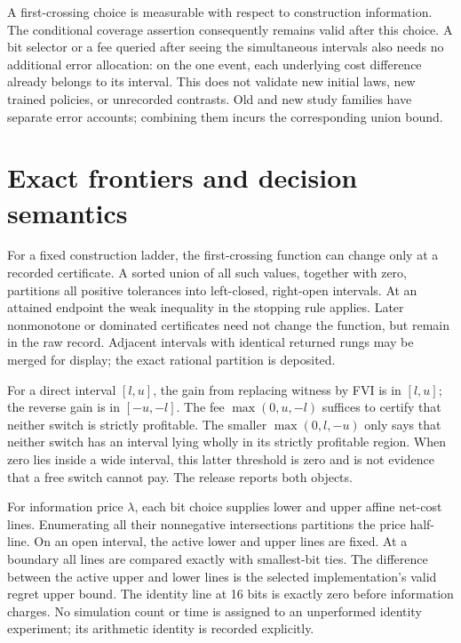 \documentclass[ecta,nameyear,draft]{econsocart}
\begin{document}
A first-crossing choice is measurable with respect to construction information. The conditional coverage assertion consequently remains valid after this choice. A bit selector or a fee queried after seeing the simultaneous intervals also needs no additional error allocation: on the one event, each underlying cost difference already belongs to its interval. This does not validate new initial laws, new trained policies, or unrecorded contrasts. Old and new study families have separate error accounts; combining them incurs the corresponding union bound.

\section{Exact frontiers and decision semantics}\label{supp:frontiers49}
For a fixed construction ladder, the first-crossing function can change only at a recorded certificate. A sorted union of all such values, together with zero, partitions all positive tolerances into left-closed, right-open intervals. At an attained endpoint the weak inequality in the stopping rule applies. Later nonmonotone or dominated certificates need not change the function, but remain in the raw record. Adjacent intervals with identical returned rungs may be merged for display; the exact rational partition is deposited.

For a direct interval $[l,u]$, the gain from replacing witness by FVI is in $[l,u]$; the reverse gain is in $[-u,-l]$. The fee $\max(0,u,-l)$ suffices to certify that neither switch is strictly profitable. The smaller $\max(0,l,-u)$ only says that neither switch has an interval lying wholly in its strictly profitable region. When zero lies inside a wide interval, this latter threshold is zero and is not evidence that a free switch cannot pay. The release reports both objects.

For information price $\lambda$, each bit choice supplies lower and upper affine net-cost lines. Enumerating all their nonnegative intersections partitions the price half-line. On an open interval, the active lower and upper lines are fixed. At a boundary all lines are compared exactly with smallest-bit ties. The difference between the active upper and lower lines is the selected implementation's valid regret upper bound. The identity line at 16 bits is exactly zero before information charges. No simulation count or time is assigned to an unperformed identity experiment; its arithmetic identity is recorded explicitly.




\end{document}
